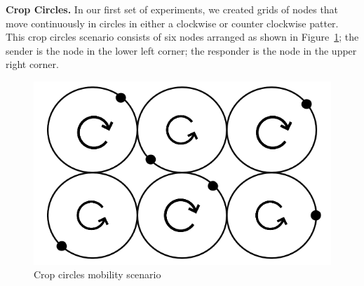 
{\bf Crop Circles.} In our first set of experiments, we created grids
of nodes that move continuously in circles in either a clockwise or
counter clockwise patter. This crop circles scenario consists of six
nodes arranged as shown in Figure~\ref{fig:cropcircle1}; the sender is
the node in the lower left corner; the responder is the node in the
upper right corner.
\begin{figure}
\vspace{-.2cm}
\begin{center}
\includegraphics[width=.75\columnwidth]{figures/cropcircle1.png}
\end{center}
\vspace{-.75cm}
\caption{Crop circles mobility scenario}\label{fig:cropcircle1}
\vspace{-.25cm}
\end{figure}

